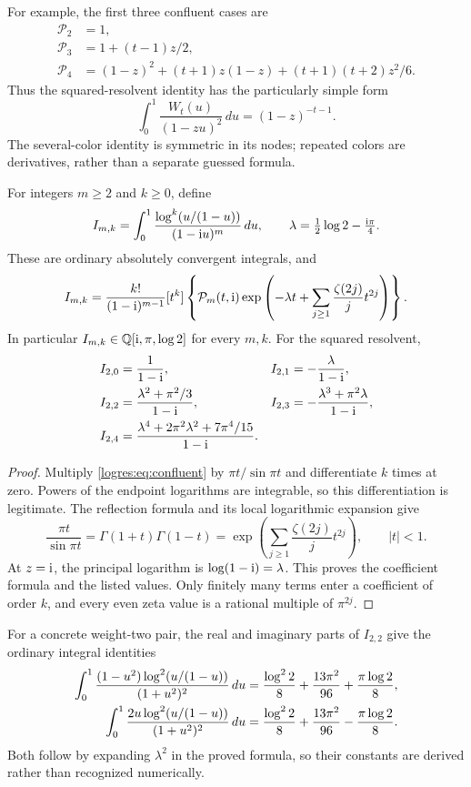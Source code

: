For example, the first three confluent cases are
\begin{align*}
 \mathcal P_2&=1,\\
 \mathcal P_3&=1+(t-1)z/2,\\
 \mathcal P_4&=(1-z)^2+(t+1)z(1-z)
                         +(t+1)(t+2)z^2/6.
\end{align*}
Thus the squared-resolvent identity has the particularly simple form
\[
 \int_0^1\frac{W_t(u)}{(1-zu)^2}\,du=(1-z)^{-t-1}.
\]
The several-color identity is symmetric in its nodes; repeated colors
are derivatives, rather than a separate guessed formula.

\begin{corollary}
\label{logres:cor:Gaussian}
For integers $m\ge2$ and $k\ge0$, define
\[
 I_{m,k}=\int_0^1\frac{\log^k(u/(1-u))}{(1-\mathrm{i} u)^m}\,du,
 \qquad \lambda=\tfrac12\log2-\tfrac{\mathrm{i}\pi}4.
\]
These are ordinary absolutely convergent integrals, and
\begin{equation}\label{logres:eq:Gaussian}
 I_{m,k}=\frac{k!}{(1-\mathrm{i})^{m-1}}
 [t^k]\left\{\mathcal P_m(t,\mathrm{i})
   \exp\left(-\lambda t+
       \sum_{j\ge1}\frac{\zeta(2j)}j t^{2j}\right)\right\}.
\end{equation}
In particular $I_{m,k}\in\mathbb{Q}[\mathrm{i},\pi,\log2]$ for every $m,k$.
For the squared resolvent,
\begin{align*}
 I_{2,0}&=\frac1{1-\mathrm{i}},&
 I_{2,1}&=-\frac{\lambda}{1-\mathrm{i}},\\
 I_{2,2}&=\frac{\lambda^2+\pi^2/3}{1-\mathrm{i}},&
 I_{2,3}&=-\frac{\lambda^3+\pi^2\lambda}{1-\mathrm{i}},\\
 I_{2,4}&=\frac{\lambda^4+2\pi^2\lambda^2+7\pi^4/15}{1-\mathrm{i}}.
\end{align*}
\end{corollary}
\begin{proof}
Multiply \eqref{logres:eq:confluent} by $\pi t/\sin\pi t$ and
differentiate $k$ times at zero. Powers of the endpoint logarithms
are integrable, so this differentiation is legitimate. The reflection
formula and its local logarithmic expansion give
\[
 \frac{\pi t}{\sin\pi t}=\Gamma(1+t)\Gamma(1-t)
    =\exp\left(\sum_{j\ge1}\frac{\zeta(2j)}j t^{2j}\right),
 \qquad |t|<1.
\]
At $z=\mathrm{i}$, the principal logarithm is
$\log(1-\mathrm{i})=\lambda$. This proves the coefficient formula and the
listed values. Only finitely many terms enter a coefficient of order
$k$, and every even zeta value is a rational multiple of $\pi^{2j}$.
\end{proof}


For a concrete weight-two pair, the real and imaginary parts of
$I_{2,2}$ give the ordinary integral identities
\begin{align}\label{logres:eq:real-second-moments}
 \int_0^1\frac{(1-u^2)\log^2(u/(1-u))}{(1+u^2)^2}\,du
 &=\frac{\log^2 2}{8}+\frac{13\pi^2}{96}
                            +\frac{\pi\log2}{8},\notag\\
 \int_0^1\frac{2u\log^2(u/(1-u))}{(1+u^2)^2}\,du
 &=\frac{\log^2 2}{8}+\frac{13\pi^2}{96}
                            -\frac{\pi\log2}{8}.
\end{align}
Both follow by expanding $\lambda^2$ in the proved formula, so their
constants are derived rather than recognized numerically.

